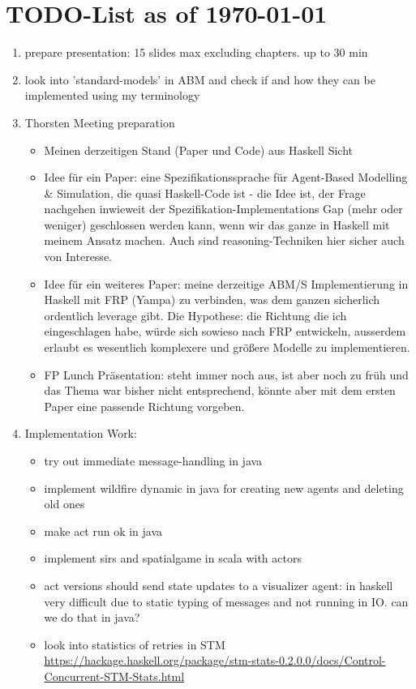 \section{TODO-List as of \today}

\begin{enumerate}

\item prepare presentation: 15 slides max excluding chapters. up to 30 min

\item look into 'standard-models' in ABM and check if and how they can be implemented using my terminology

\item Thorsten Meeting preparation
\begin{itemize}
	\item Meinen derzeitigen Stand (Paper und Code) aus Haskell Sicht
	\item Idee für ein Paper: eine Spezifikationssprache für Agent-Based Modelling & Simulation, die quasi Haskell-Code ist - die Idee ist, der Frage nachgehen inwieweit der Spezifikation-Implementations Gap (mehr oder weniger) geschlossen werden kann, wenn wir das ganze in Haskell mit meinem Ansatz machen. Auch sind reasoning-Techniken hier sicher auch von Interesse.
	\item Idee für ein weiteres Paper: meine derzeitige ABM/S Implementierung in Haskell mit FRP (Yampa) zu verbinden, was dem ganzen sicherlich ordentlich leverage gibt. Die Hypothese: die Richtung die ich eingeschlagen habe, würde sich sowieso nach FRP entwickeln, ausserdem erlaubt es wesentlich komplexere und größere Modelle zu implementieren.
	\item FP Lunch Präsentation: steht immer noch aus, ist aber noch zu früh und das Thema war bisher nicht entsprechend, könnte aber mit dem ersten Paper eine passende Richtung vorgeben.
\end{itemize}

\item Implementation Work:
	\begin{itemize}
		\item try out immediate message-handling in java
		\item implement wildfire dynamic in java for creating new agents and deleting old ones
		\item make act run ok in java
		\item implement sirs and spatialgame in scala with actors
		\item act versions should send state updates to a visualizer agent: in haskell very difficult due to static typing of messages and not running in IO. can we do that in java?
		\item look into statistics of retries in STM \url{https://hackage.haskell.org/package/stm-stats-0.2.0.0/docs/Control-Concurrent-STM-Stats.html}
	\end{itemize}


\end{enumerate}
